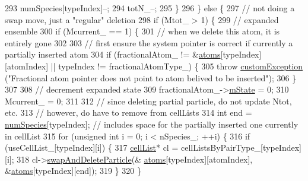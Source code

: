 \begin{DoxyCode}
293                     numSpecies[typeIndex]--;
294                     totN\_--;
295                 \}
296             \} \textcolor{keywordflow}{else} \{
297                 \textcolor{comment}{// not doing a swap move, just a "regular" deletion}
298                 \textcolor{keywordflow}{if} (Mtot\_ > 1) \{
299                     \textcolor{comment}{// expanded ensemble}
300                     \textcolor{keywordflow}{if} (Mcurrent\_ == 1) \{
301                         \textcolor{comment}{// when we delete this atom, it is entirely gone}
302 
303                         \textcolor{comment}{// first ensure the system pointer is correct if currently a partially inserted
       atom}
304                         \textcolor{keywordflow}{if} (fractionalAtom\_ != &\hyperlink{classsim_system_a90421b19082f7fb8fc23b7264b1161e4}{atoms}[typeIndex][atomIndex] || typeIndex != 
      fractionalAtomType\_) \{
305                             \textcolor{keywordflow}{throw} \hyperlink{classcustom_exception}{customException} (\textcolor{stringliteral}{"Fractional atom pointer does not point
       to atom belived to be inserted"});
306                         \}
307 
308                         \textcolor{comment}{// decrement expanded state}
309                         fractionalAtom\_->\hyperlink{classatom_a3cb00c0c5b7533657e05af6ff4a42740}{mState} = 0;
310                         Mcurrent\_ = 0;
311 
312                         \textcolor{comment}{// since deleting partial particle, do not update Ntot, etc.}
313                         \textcolor{comment}{// however, do have to remove from cellLists}
314                         \textcolor{keywordtype}{int} end = \hyperlink{classsim_system_a9eea865e6dc1cff377b1e79c4d9c23f0}{numSpecies}[typeIndex]; \textcolor{comment}{// includes space for the partially
       inserted one currently in cellList}
315                         \textcolor{keywordflow}{for} (\textcolor{keywordtype}{unsigned} \textcolor{keywordtype}{int} i = 0; i < nSpecies\_; ++i) \{
316                             \textcolor{keywordflow}{if} (useCellList\_[typeIndex][i]) \{
317                                 \hyperlink{classcell_list}{cellList}* cl = cellListsByPairType\_[typeIndex][i];
318                                 cl->\hyperlink{classcell_list_a31caca1e8dd05c33215ac7495d55aeea}{swapAndDeleteParticle}(&
      \hyperlink{classsim_system_a90421b19082f7fb8fc23b7264b1161e4}{atoms}[typeIndex][atomIndex], &\hyperlink{classsim_system_a90421b19082f7fb8fc23b7264b1161e4}{atoms}[typeIndex][end]);
319                             \}
320                         \}

\end{DoxyCode}
